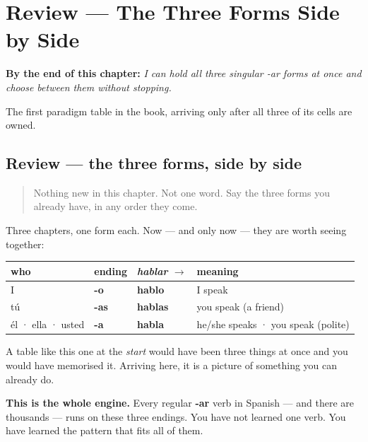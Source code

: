 
\chapter{Review --- The Three Forms Side by Side}
\label{ch:review-ar-singular}

\begin{chapteropening}
\textbf{By the end of this chapter:} \emph{I can hold all three singular -ar forms at once and choose between them without stopping.}

The first paradigm table in the book, arriving only after all three of its cells are owned.
\end{chapteropening}

\section[Practice]{Review — the three forms, side by side}

\label{lesson:ES-C06-ar-presente}



\begin{quote}
Nothing new in this chapter. Not one word. Say the three forms you already have, in any order they come.
\end{quote}

\begin{grammarlens}[title={Grammar Lens: the table you have earned}]
Three chapters, one form each. Now — and only now — they are worth seeing together:

\noindent
\begin{tabularx}{\linewidth}{@{}>{\raggedright\arraybackslash}X>{\raggedright\arraybackslash}X>{\raggedright\arraybackslash}X>{\raggedright\arraybackslash}X@{}}
\toprule
\textbf{who} & \textbf{ending} & \textbf{\emph{hablar} $\to$} & \textbf{meaning} \\
\midrule
I & \textbf{-o} & \textbf{hablo} & I speak \\
tú & \textbf{-as} & \textbf{hablas} & you speak (a friend) \\
él · ella · usted & \textbf{-a} & \textbf{habla} & he/she speaks · you speak (polite) \\
\bottomrule
\end{tabularx}

A table like this one at the \emph{start} would have been three things at once and you would have memorised it. Arriving here, it is a picture of something you can already do.

\textbf{This is the whole engine.} Every regular \textbf{-ar} verb in Spanish — and there are thousands — runs on these three endings. You have not learned one verb. You have learned the pattern that fits all of them.
\end{grammarlens}

